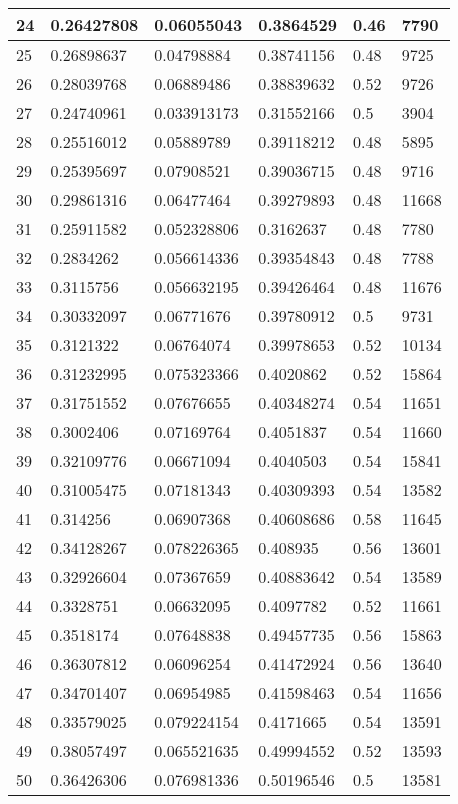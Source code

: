 \begin{longtable}{|l|l|l|l|l|l|}
24 & 0.26427808 & 0.06055043 & 0.3864529 & 0.46 & 7790 \\ \hline 
25 & 0.26898637 & 0.04798884 & 0.38741156 & 0.48 & 9725 \\ \hline 
26 & 0.28039768 & 0.06889486 & 0.38839632 & 0.52 & 9726 \\ \hline 
27 & 0.24740961 & 0.033913173 & 0.31552166 & 0.5 & 3904 \\ \hline 
28 & 0.25516012 & 0.05889789 & 0.39118212 & 0.48 & 5895 \\ \hline 
29 & 0.25395697 & 0.07908521 & 0.39036715 & 0.48 & 9716 \\ \hline 
30 & 0.29861316 & 0.06477464 & 0.39279893 & 0.48 & 11668 \\ \hline 
31 & 0.25911582 & 0.052328806 & 0.3162637 & 0.48 & 7780 \\ \hline 
32 & 0.2834262 & 0.056614336 & 0.39354843 & 0.48 & 7788 \\ \hline 
33 & 0.3115756 & 0.056632195 & 0.39426464 & 0.48 & 11676 \\ \hline 
34 & 0.30332097 & 0.06771676 & 0.39780912 & 0.5 & 9731 \\ \hline 
35 & 0.3121322 & 0.06764074 & 0.39978653 & 0.52 & 10134 \\ \hline 
36 & 0.31232995 & 0.075323366 & 0.4020862 & 0.52 & 15864 \\ \hline 
37 & 0.31751552 & 0.07676655 & 0.40348274 & 0.54 & 11651 \\ \hline 
38 & 0.3002406 & 0.07169764 & 0.4051837 & 0.54 & 11660 \\ \hline 
39 & 0.32109776 & 0.06671094 & 0.4040503 & 0.54 & 15841 \\ \hline 
40 & 0.31005475 & 0.07181343 & 0.40309393 & 0.54 & 13582 \\ \hline 
41 & 0.314256 & 0.06907368 & 0.40608686 & 0.58 & 11645 \\ \hline 
42 & 0.34128267 & 0.078226365 & 0.408935 & 0.56 & 13601 \\ \hline 
43 & 0.32926604 & 0.07367659 & 0.40883642 & 0.54 & 13589 \\ \hline 
44 & 0.3328751 & 0.06632095 & 0.4097782 & 0.52 & 11661 \\ \hline 
45 & 0.3518174 & 0.07648838 & 0.49457735 & 0.56 & 15863 \\ \hline 
46 & 0.36307812 & 0.06096254 & 0.41472924 & 0.56 & 13640 \\ \hline 
47 & 0.34701407 & 0.06954985 & 0.41598463 & 0.54 & 11656 \\ \hline 
48 & 0.33579025 & 0.079224154 & 0.4171665 & 0.54 & 13591 \\ \hline 
49 & 0.38057497 & 0.065521635 & 0.49994552 & 0.52 & 13593 \\ \hline 
50 & 0.36426306 & 0.076981336 & 0.50196546 & 0.5 & 13581 \\ \hline 
\end{longtable}